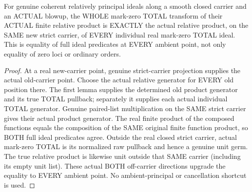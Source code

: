 \begin{theorem}
\label{hir:sharp-actual-relative-finite-product-whole-total-commutation}
\leanok
For genuine coherent relatively principal ideals along a smooth closed
carrier and an ACTUAL blowup, the WHOLE mark-zero TOTAL transform of their
ACTUAL finite relative product is EXACTLY the actual relative product,
on the SAME new strict carrier, of EVERY individual real mark-zero TOTAL
ideal. This is equality of full ideal predicates at EVERY ambient point,
not only equality of zero loci or ordinary orders.
\end{theorem}
\begin{proof}
At a real new-carrier point, genuine strict-carrier projection supplies
the actual old-carrier point. Choose the actual relative generator for
EVERY old position there. The first lemma supplies the determined old
product generator and its true TOTAL pullback; separately it supplies each
actual individual TOTAL generator. Genuine paired-list multiplication on
the SAME strict carrier gives their actual product generator. The real
finite product of the composed functions equals the composition of the
SAME original finite function product, so BOTH full ideal predicates agree.
Outside the real closed strict carrier, actual mark-zero TOTAL is its
normalized raw pullback and hence a genuine unit germ. The true relative
product is likewise unit outside that SAME carrier (including its empty
unit list). These actual BOTH off-carrier directions upgrade the equality
to EVERY ambient point. No ambient-principal or cancellation shortcut is used.
\end{proof}

